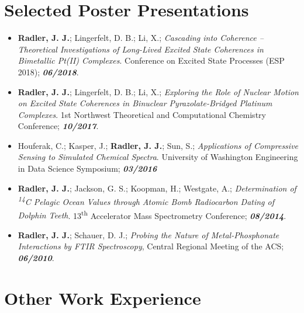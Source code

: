 \documentclass[letterpaper]{radler-resume-class}
\begin{document}
%
%
\vspace{0pt}
\begin{minipage}[t]{0.65\textwidth} %


\section{Selected Poster Presentations}
\begin{itemize}
\item \textbf{Radler, J. J.}; Lingerfelt, D. B.; Li, X.; \emph{Cascading into Coherence -- Theoretical Investigations of Long-Lived Excited State Coherences in Bimetallic Pt(II) Complexes}. Conference on Excited State Processes (ESP 2018);	\textbf{\textit{06/2018}}.

\item \textbf{Radler, J. J.}; Lingerfelt, D. B.; Li, X.; \emph{Exploring the Role of Nuclear Motion on Excited State Coherences in Binuclear Pyrazolate-Bridged Platinum Complexes}. 1st Northwest Theoretical and Computational Chemistry Conference;	\textbf{\textit{10/2017}}.

\item Houferak, C.; Kasper, J.; \textbf{Radler, J. J.}; Sun, S.; \emph{Applications of Compressive Sensing to Simulated Chemical Spectra}. University of Washington Engineering in Data Science Symposium;	\textbf{\textit{03/2016}}

\item \textbf{Radler, J. J.}; Jackson, G. S.; Koopman, H.; Westgate, A.; \emph{Determination of \textsuperscript{14}C Pelagic Ocean Values through Atomic Bomb Radiocarbon Dating of Dolphin Teeth}. 13\textsuperscript{th} Accelerator Mass Spectrometry Conference;	\textbf{\textit{08/2014}}.

\item \textbf{Radler, J. J.}; Schauer, D. J.; \emph{Probing the Nature of Metal-Phosphonate Interactions by FTIR Spectroscopy}, Central Regional Meeting of the ACS;	\textbf{\textit{06/2010}}.
\end{itemize}


\section{Other Work Experience}
\sectionspace

\end{minipage}
\end{document}
